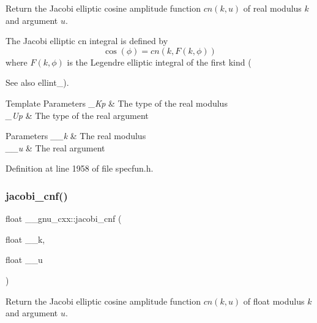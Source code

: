 Return the Jacobi elliptic cosine amplitude function $ cn(k,u) $ of real modulus $ k $ and argument $ u $.

The Jacobi elliptic {\ttfamily cn} integral is defined by \[ \cos(\phi) = cn(k, F(k,\phi)) \] where $ F(k,\phi) $ is the Legendre elliptic integral of the first kind (\begin{DoxySeeAlso}{See also}
ellint\+\_).
\end{DoxySeeAlso}

\begin{DoxyTemplParams}{Template Parameters}
{\em \+\_\+\+Kp} & The type of the real modulus \\
\hline
{\em \+\_\+\+Up} & The type of the real argument \\
\hline
\end{DoxyTemplParams}

\begin{DoxyParams}{Parameters}
{\em \+\_\+\+\_\+k} & The real modulus \\
\hline
{\em \+\_\+\+\_\+u} & The real argument \\
\hline
\end{DoxyParams}


Definition at line 1958 of file specfun.\+h.

\mbox{\label{group__gnu__math__spec__func_gadbd6320123f45ae10d539cf8df0373cd}} 
\subsubsection{\texorpdfstring{jacobi\+\_\+cnf()}{jacobi\_cnf()}}
{\footnotesize\ttfamily float \+\_\+\+\_\+gnu\+\_\+cxx\+::jacobi\+\_\+cnf (\begin{DoxyParamCaption}\item[{float}]{\+\_\+\+\_\+k,  }\item[{float}]{\+\_\+\+\_\+u }\end{DoxyParamCaption})\hspace{0.3cm}{\ttfamily [inline]}}

Return the Jacobi elliptic cosine amplitude function $ cn(k,u) $ of {\ttfamily float} modulus $ k $ and argument $ u $.

